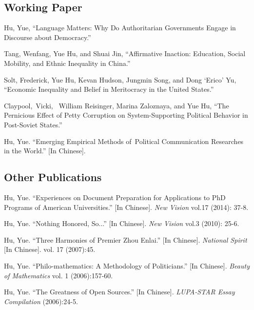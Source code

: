 \documentclass[letterpaper]{article}
\renewenvironment{itemize}{
  \begin{list}{}{
    \setlength{\leftmargin}{1.5em}
  }
}{
  \end{list}
}
\begin{document}
\subsection*{Working Paper}
\begin{itemize}
\item Hu, Yue, ``Language Matters: Why Do Authoritarian Governments Engage in Discourse about Democracy.''
\item Tang, Wenfang, Yue Hu, and Shuai Jin, ``Affirmative Inaction: Education, Social Mobility, and Ethnic Inequality in China.''
\item Solt, Frederick, Yue Hu, Kevan Hudson, Jungmin Song, and Dong `Erico' Yu, ``Economic Inequality and Belief in Meritocracy in the United States.''
\item Claypool, Vicki,  William Reisinger, Marina Zaloznaya, and Yue Hu, ``The Pernicious Effect of Petty Corruption on System-Supporting Political Behavior in Post-Soviet States.''
\item Hu, Yue. ``Emerging Empirical Methods of Political Communication Researches in the World.'' [In Chinese].
\end{itemize}

\subsection*{Other Publications}
\begin{itemize} 
\item Hu, Yue. ``Experiences on Document Preparation for Applications to PhD Programs of American Universities.'' [In Chinese]. \textit{New Vision} vol.17 (2014): 37-8.
\item Hu, Yue. ``Nothing Honored, So...'' [In Chinese]. \textit{New Vision} vol.3 (2010): 25-6.
\item Hu, Yue. ``Three Harmonies of Premier Zhou Enlai.'' [In Chinese]. \textit{National Spirit} [In Chinese]. vol. 17 (2007):45.
\item Hu, Yue. ``Philo-mathematics: A Methodology of Politicians.'' [In Chinese]. \textit{Beauty of Mathematics} vol. 1 (2006):157-60.
\item Hu, Yue. ``The Greatness of Open Sources.'' [In Chinese]. \textit{LUPA-STAR Essay Compilation} (2006):24-5.
\end{itemize}
\end{document}
